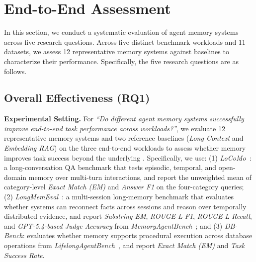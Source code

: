 \section{End-to-End Assessment}
\label{sec:overall}

In this section, we conduct a systematic evaluation of agent memory systems across five research questions.
Across five distinct benchmark workloads and 11 datasets, we assess 12 representative memory systems against baselines to characterize their performance.
Specifically, the five research questions are as follows.


\subsection{Overall Effectiveness (RQ1)}
\label{subsec:effectiveness}

\noindent \textbf{Experimental Setting.}
For \textit{``Do different agent memory systems successfully improve end-to-end task performance across workloads?''}, we evaluate 12 representative memory systems and two reference baselines (\textit{Long Context} and \textit{Embedding RAG}) on the three end-to-end workloads to assess whether memory improves task success beyond the underlying \llm.
Specifically, we use: (1) \textit{LoCoMo}~\cite{maharana2024locomo}: a long-conversation QA benchmark that tests episodic, temporal, and open-domain memory over multi-turn interactions, and report the unweighted mean of category-level \textit{Exact Match (EM)} and \textit{Answer F1} on the four-category queries;
(2) \textit{LongMemEval}~\cite{wu2024longmemeval}: a multi-session long-memory benchmark that evaluates whether systems can reconnect facts across sessions and reason over temporally distributed evidence, and report \textit{Substring EM}, \textit{ROUGE-L F1}, \textit{ROUGE-L Recall}, and \textit{GPT-5.4-based \llm Judge Accuracy} from \textit{MemoryAgentBench}~\cite{memoryagentbench2026}; and (3) \textit{DB-Bench}: evaluates whether memory supports procedural execution across database operations from \textit{LifelongAgentBench}~\cite{DBLP:journals/corr/abs-2505-11942}, and report \textit{Exact Match (EM)} and \textit{Task Success Rate}.

